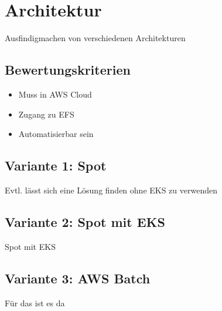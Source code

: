 \section{Architektur}
Ausfindigmachen von verschiedenen Architekturen
\subsection{Bewertungskriterien}
\begin{itemize}
\item Muss in AWS Cloud
\item Zugang zu EFS
\item Automatisierbar sein
\end{itemize}
\subsection{Variante 1: Spot}
Evtl. lässt sich eine Lösung finden ohne EKS zu verwenden

\subsection{Variante 2: Spot mit EKS}
Spot mit EKS

\subsection{Variante 3: AWS Batch}
Für das ist es da